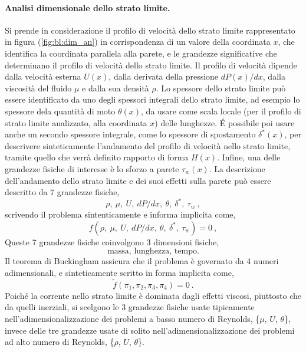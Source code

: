 \paragraph{Analisi dimensionale dello strato limite.}
Si prende in considerazione il profilo di velocità dello strato limite rappresentato in figura (\ref{fig:bl:dim_an}) in corrispondenza di un valore della coordinata $x$, che identifica la coordinata parallela alla parete, e le grandezze significative che determinano il profilo di velocità dello strato limite. Il profilo di velocità dipende dalla velocità esterna $U(x)$, dalla derivata della pressione $dP(x)/dx$, dalla viscosità del fluido $\mu$ e dalla sua densità $\rho$. Lo spessore dello strato limite può essere identificato da uno degli spessori integrali dello strato limite, ad esempio lo spessore dela quantità di moto $\theta(x)$, da usare come scala locale (per il profilo di strato limite analizzato, alla coordinata $x$) delle lunghezze. \'E possibile poi usare anche un secondo spessore integrale, come lo spessore di spostamento $\delta^*(x)$, per descrivere sinteticamente l'andamento del profilo di velocità nello strato limite, tramite quello che verrà definito rapporto di forma $H(x)$. Infine, una delle grandezze fisiche di interesse è lo sforzo a parete $\tau_w(x)$. La descrizione dell'andamento dello strato limite e dei suoi effetti sulla parete può essere descritto da 7 grandezze fisiche,
\begin{equation}
  \rho, \  \mu, \ U, \ dP/dx, \ \theta, \ \delta^*, \ \tau_w \ ,
\end{equation}
scrivendo il problema sintenticamente e informa implicita come,
\begin{equation}
 f( \rho, \  \mu, \ U, \ dP/dx, \ \theta, \ \delta^*, \ \tau_w ) = 0 \ ,
\end{equation}
%
Queste 7 grandezze fisiche coinvolgono 3 dimensioni fisiche,
\begin{equation}
 \text{massa, lunghezza, tempo.}
\end{equation}
Il teorema di Buckingham assicura che il problema è governato da 4 numeri adimensionali, e sinteticamente scritto in forma implicita come,
\begin{equation}
  \tilde{f}(\pi_1, \pi_2, \pi_3, \pi_4) = 0 \ .
\end{equation}
Poiché la corrente nello strato limite è dominata dagli effetti viscosi, piuttosto che da quelli inerziali, si scelgono le 3 grandezze fisiche usate tipicamente nell'adimensionalizzazione dei problemi a basso numero di Reynolds, \{$\mu$, $U$, $\theta$\}, invece delle tre grandezze usate di solito nell'adimensionalizzazione dei problemi ad alto numero di Reynolds, \{$\rho$, $U$, $\theta$\}.
